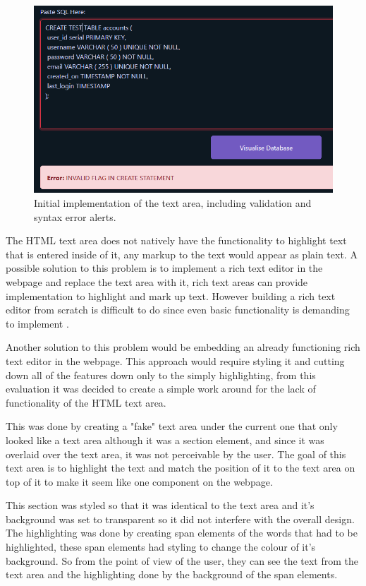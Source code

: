 \begin{figure}[h!]
	\centering
	\includegraphics[width=\textwidth]{textArea}
	\caption{Initial implementation of the text area, including validation and syntax error alerts.}
	\label{fig:textArea}
\end{figure}

The HTML text area does not natively have the functionality to highlight text that is entered inside of it, any markup to the text would appear as plain text. A possible solution to this problem is to implement a rich text editor in the webpage and replace the text area with it, rich text areas can provide implementation to highlight and mark up text. However building a rich text editor from scratch is difficult to do since even basic functionality is demanding to implement \cite{highlightText}.

Another solution to this problem would be embedding an already functioning rich text editor in the webpage. This approach would require styling it and cutting down all of the features down only to the simply highlighting, from this evaluation it was decided to create a simple work around for the lack of functionality of the HTML text area. 

This was done by creating a "fake" text area under the current one that only looked like a text area although it was a section element, and since it was overlaid over the text area, it was not perceivable by the user. The goal of this text area is to highlight the text and match the position of it to the text area on top of it to make it seem like one component on the webpage. 

This section was styled so that it was identical to the text area and it's background was set to transparent so it did not interfere with the overall design. The highlighting was done by creating span elements of the words that had to be highlighted, these span elements had styling to change the colour of it's background. So from the point of view of the user, they can see the text from the text area and the highlighting done by the background of the span elements.


